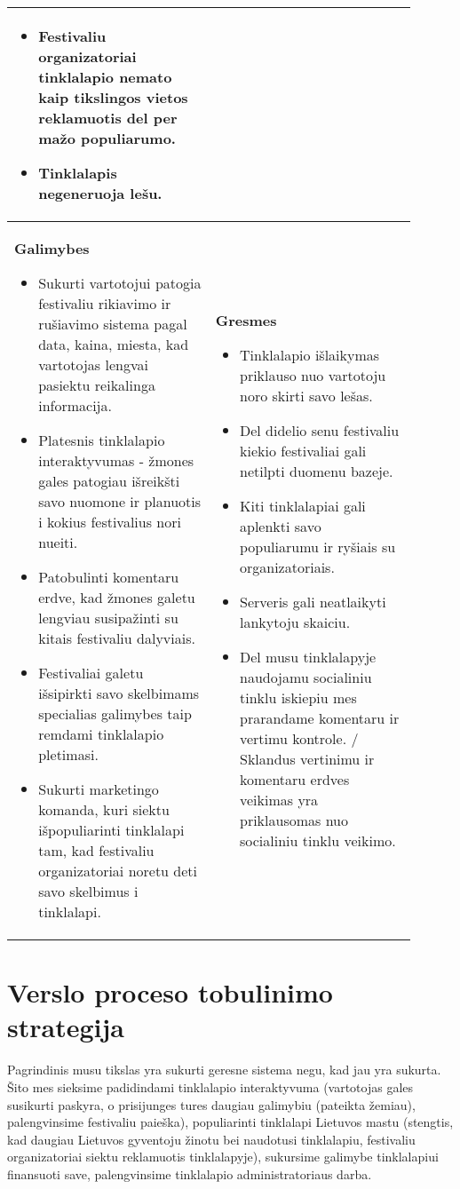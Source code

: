 ﻿\documentclass{VUMIFPSkursinis}
\begin{document}
{\begin{longtable}{|p{0.45\linewidth}|p{0.45\linewidth}|}
\begin{itemize}
	\item Festivaliu organizatoriai tinklalapio nemato kaip tikslingos vietos reklamuotis del per mažo populiarumo.
	\item Tinklalapis negeneruoja lešu.
  \end{itemize}\\
  \hline
  \textbf{Galimybes}
  \begin{itemize}
	\item Sukurti vartotojui patogia festivaliu rikiavimo ir rušiavimo sistema pagal data, kaina, miesta, kad vartotojas lengvai pasiektu reikalinga informacija.
	\item Platesnis tinklalapio interaktyvumas - žmones gales patogiau išreikšti savo nuomone ir planuotis i kokius festivalius nori nueiti.
	\item Patobulinti komentaru erdve, kad žmones galetu lengviau susipažinti su kitais festivaliu dalyviais.
	\item Festivaliai galetu išsipirkti savo  skelbimams specialias galimybes taip remdami tinklalapio pletimasi.
	\item Sukurti marketingo komanda, kuri siektu išpopuliarinti tinklalapi tam, kad festivaliu organizatoriai noretu deti savo skelbimus i tinklalapi.
  \end{itemize}
  &
  \textbf{Gresmes}
  \begin{itemize}
	\item Tinklalapio išlaikymas priklauso nuo vartotoju noro skirti savo lešas.
	\item Del didelio senu festivaliu kiekio festivaliai gali netilpti duomenu bazeje.
	\item Kiti tinklalapiai gali aplenkti savo populiarumu ir ryšiais su organizatoriais.
	\item Serveris gali neatlaikyti lankytoju skaiciu.
	\item Del musu tinklalapyje naudojamu socialiniu tinklu iskiepiu mes prarandame komentaru ir vertimu kontrole. / Sklandus vertinimu ir komentaru erdves veikimas yra priklausomas nuo socialiniu tinklu veikimo.
  \end{itemize}\\
  \hline
\end{longtable}

\section{Verslo proceso tobulinimo strategija}
Pagrindinis musu tikslas yra sukurti geresne sistema negu, kad jau yra sukurta. Šito mes sieksime padidindami tinklalapio interaktyvuma (vartotojas gales susikurti paskyra, o prisijunges tures daugiau galimybiu (pateikta žemiau), palengvinsime festivaliu paieška), populiarinti tinklalapi Lietuvos mastu (stengtis, kad daugiau Lietuvos gyventoju žinotu bei naudotusi tinklalapiu, festivaliu organizatoriai siektu reklamuotis tinklalapyje), sukursime galimybe tinklalapiui finansuoti save, palengvinsime tinklalapio administratoriaus darba.

}
\end{document}
